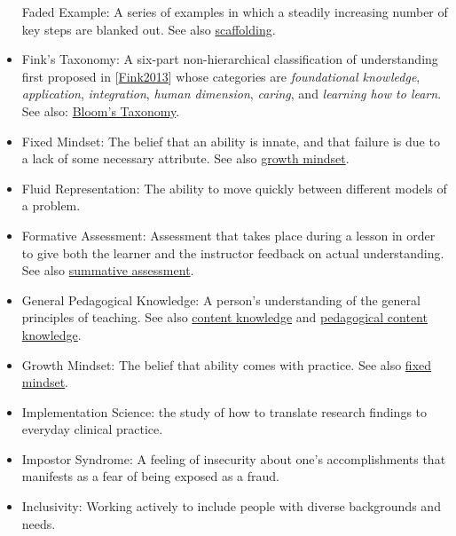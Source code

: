 \documentclass[10pt,statementpaper]{memoir}
\begin{document}
\begin{itemize}
  \protect\hypertarget{faded-example}{}{Faded Example}: A series of
  examples in which a steadily increasing number of key steps are
  blanked out. See also \href{gloss.html\#scaffolding}{scaffolding}.
\item
  \protect\hypertarget{finks-taxonomy}{}{Fink's Taxonomy}: { A six-part
  non-hierarchical classification of understanding first proposed in
  {[}\href{biblio.html\#fink-significant}{Fink2013}{]} whose categories
  are \emph{foundational knowledge}, \emph{application},
  \emph{integration}, \emph{human dimension}, \emph{caring}, and
  \emph{learning how to learn}. See also:
  \href{gloss.html\#blooms-taxonomy}{Bloom's Taxonomy}. }
\item
  \protect\hypertarget{fixed-mindset}{}{Fixed Mindset}: The belief that
  an ability is innate, and that failure is due to a lack of some
  necessary attribute. See also \href{gloss.html\#growth-mindset}{growth
  mindset}.
\item
  \protect\hypertarget{fluid-representation}{}{Fluid Representation}:
  The ability to move quickly between different models of a problem.
\item
  \protect\hypertarget{formative-assessment}{}{Formative Assessment}:
  Assessment that takes place during a lesson in order to give both the
  learner and the instructor feedback on actual understanding. See also
  \href{gloss.html\#summative-assessment}{summative assessment}.
\item
  \protect\hypertarget{general-pedagogical-knowledge}{}{General
  Pedagogical Knowledge}: A person's understanding of the general
  principles of teaching. See also
  \href{gloss.html\#content-knowledge}{content knowledge} and
  \href{gloss.html\#pedagogical-content-knowledge}{pedagogical content
  knowledge}.
\item
  \protect\hypertarget{growth-mindset}{}{Growth Mindset}: The belief
  that ability comes with practice. See also
  \href{gloss.html\#fixed-mindset}{fixed mindset}.
\item
  \protect\hypertarget{implementation-science}{}{Implementation
  Science}: { the study of how to translate research findings to
  everyday clinical practice. }
\item
  \protect\hypertarget{impostor-syndrome}{}{Impostor Syndrome}: A
  feeling of insecurity about one's accomplishments that manifests as a
  fear of being exposed as a fraud.
\item
  \protect\hypertarget{inclusivity}{}{Inclusivity}: Working actively to
  include people with diverse backgrounds and needs.

\end{itemize}
\end{document}
